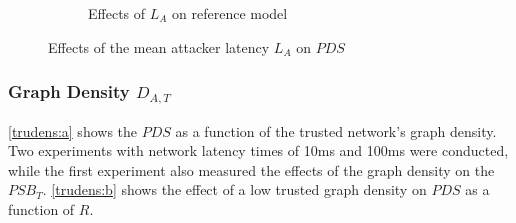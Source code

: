 \documentclass[a4paper,12pt,twoside]{report}
\begin{document}
\begin{figure}
\begin{subfigure}{.5\textwidth}
  \caption{Effects of $L_{A}$ on reference model}
  \label{attlat:b}
\end{subfigure}
\caption{Effects of the mean attacker latency $L_{A}$ on $PDS$}
\label{attlat}
\end{figure}

\subsubsection{Graph Density $D_{A,T}$}
\autoref{trudens:a} shows the $PDS$ as a function of the trusted network's graph density. Two experiments with network latency times of 10ms and 100ms were conducted, while the first experiment also measured the effects of the graph density on the $PSB_T$. \autoref{trudens:b} shows the effect of a low trusted graph density on $PDS$ as a function of $R$.
\end{document}
